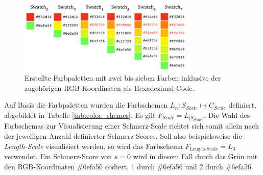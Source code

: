 \begin{figure}[h]
	\centering
	\includegraphics[width=0.75\textwidth]{bilder/colorpics.png}
	\caption[Farbpaletten mit zwei bis sieben Farben ]{Erstellte Farbpaletten mit zwei bis sieben Farben inklusive der zugehörigen RGB-Koordinaten als Hexadezimal-Code.}
	\label{fig:color-swatches}
\end{figure}

Auf Basis die Farbpaletten wurden die Farbschemen $L_{n}: S_{Scale} \mapsto C_{Scale}$ definiert, abgebildet in Tabelle \ref{tab:color_shemes}. Es gilt $F_{Scale} = L_{|S_{Scale}|}$. Die Wahl des Farbschemas zur Visualisierung einer Schmerz-Scale richtet sich somit allein nach der jeweiligen Anzahl definierter Schmerz-Scores. Soll also beispielsweise die \emph{Length-Scale} visualisiert werden, so wird das Farbschema $F_{\text{Length-Scale}} = L_3$ verwendet. Ein Schmerz-Score von $s = 0$ wird in diesem Fall durch das Grün mit den RGB-Koordinaten \#6efa56 codiert, 1 durch \#6efa56 und 2 durch \#6efa56.

